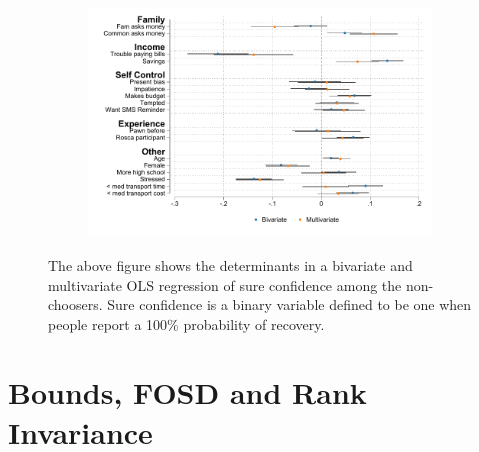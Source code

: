 \begin{appendix}
\begin{figure}[H]
\caption{Determinants sure confidence.}
    \begin{center}
    \begin{subfigure}{0.60\textwidth}
        \centering
        \includegraphics[width=\textwidth]{Figuras/determinants_confidence_100.pdf}
    \end{subfigure}
    \end{center}
     \footnotesize{The above figure shows the determinants in a bivariate and multivariate OLS regression of sure confidence among the non-choosers. Sure confidence is a binary variable defined to be one when people report a 100\% probability of recovery.}
    \label{determinants_sure}
\end{figure}


\newpage


\section{Bounds, FOSD and Rank Invariance} \label{bounds_FOSD}


\end{appendix}
